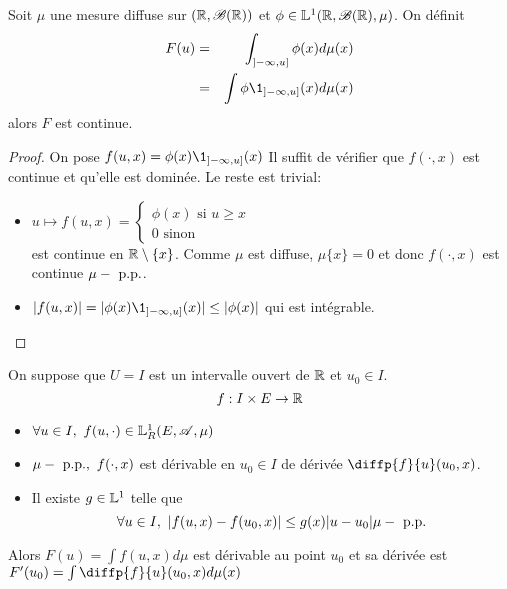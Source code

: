 \begin{example}
	Soit $\mu$ une mesure diffuse sur $(\mathbb{R}, \mathscr{B}(\mathbb{R}))$ et $\phi \in \mathbb{L}^1(\mathbb{R}, \mathscr{B}(\mathbb{R}), \mu)$.
	On définit \begin{eqnarray*}
		F(u) &=&  \int_{]-\infty, u]} \phi(x)d\mu(x)\\
		& = & \int \phi \1_{]-\infty, u]}(x)d\mu(x)
	\end{eqnarray*}
	alors $F$ est continue.

	\begin{proof}
		On pose $f(u,x) = \phi(x)\1_{]-\infty, u]}(x)$
		Il suffit de vérifier que $f(\cdot, x)$ est continue et qu'elle est dominée. Le reste est trivial: \\
		\begin{itemize}
			\item $u \mapsto f(u,x) = \left\{
				      \begin{array}{l}
					      \phi(x) \text{ si } u \geq x \\
					      0 \text{ sinon}
				      \end{array}
				      \right.$ \\
			      est continue en $\mathbb{R}\setminus\{x\}$. Comme $\mu$ est diffuse, $\mu \{x\} = 0$ et donc $f(\cdot, x)$ est continue $\mu-\text{ p.p.}$.
			\item $|f(u,x)| = |\phi(x)\1_{]-\infty, u]}(x)| \leq |\phi(x)|$ qui est intégrable.
		\end{itemize}
	\end{proof}
\end{example}


\begin{theorem}
	On suppose que $U = I$ est un intervalle ouvert de $\mathbb{R}$ et $u_0 \in I$.\\
	$$ f: I\times E \to \mathbb{R}$$
	\begin{itemize}
		\item $\forall u \in I, \ f(u, \cdot) \in \mathbb{L}^1_R(E,\mathscr{A}, \mu)$
		\item $\mu-\text{ p.p.},\  f(\cdot, x)$ est dérivable en $u_0 \in I$ de dérivée $\diffp{f}{u} (u_0, x)$.
		\item Il existe $g\in \mathbb{L}^1$ telle que
		      $$ \forall u\in I,\ |f(u,x) - f(u_0,x)| \leq g(x)|u-u_0| \mu-\text{ p.p.}$$
	\end{itemize}

	Alors $F(u) = \int f(u,x)d\mu$ est dérivable au point $u_0$ et sa dérivée est $F'(u_0) = \int \diffp{f}{u}(u_0,x)d\mu(x)$
\end{theorem}

